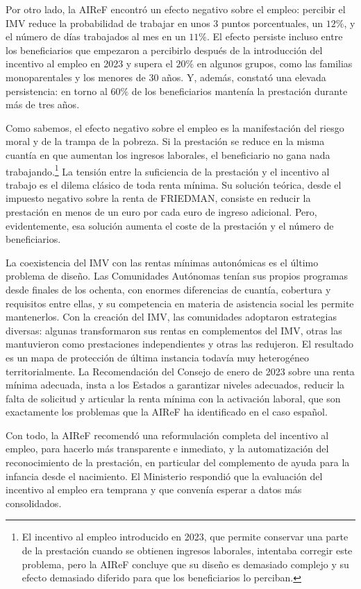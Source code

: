 \documentclass[10pt,a4paper]{article}
\begin{document}
Por otro lado, la AIReF encontró un efecto negativo sobre el empleo: percibir el IMV reduce la probabilidad de trabajar en unos $3$ puntos porcentuales, un $12\%$, y el número de días trabajados al mes en un $11\%$. El efecto persiste incluso entre los beneficiarios que empezaron a percibirlo después de la introducción del incentivo al empleo en 2023 y supera el $20\%$ en algunos grupos, como las familias monoparentales y los menores de $30$ años. Y, además, constató una elevada persistencia: en torno al $60\%$ de los beneficiarios mantenía la prestación durante más de tres años.

Como sabemos, el efecto negativo sobre el empleo es la manifestación del riesgo moral y de la trampa de la pobreza. Si la prestación se reduce en la misma cuantía en que aumentan los ingresos laborales, el beneficiario no gana nada trabajando.\footnote{El incentivo al empleo introducido en 2023, que permite conservar una parte de la prestación cuando se obtienen ingresos laborales, intentaba corregir este problema, pero la AIReF concluye que su diseño es demasiado complejo y su efecto demasiado diferido para que los beneficiarios lo perciban.
} La tensión entre la suficiencia de la prestación y el incentivo al trabajo es el dilema clásico de toda renta mínima. Su solución teórica, desde el impuesto negativo sobre la renta de FRIEDMAN, consiste en reducir la prestación en menos de un euro por cada euro de ingreso adicional. Pero, evidentemente, esa solución aumenta el coste de la prestación y el número de beneficiarios.

La coexistencia del IMV con las rentas mínimas autonómicas es el último problema de diseño. Las Comunidades Autónomas tenían sus propios programas desde finales de los ochenta, con enormes diferencias de cuantía, cobertura y requisitos entre ellas, y su competencia en materia de asistencia social les permite mantenerlos. Con la creación del IMV, las comunidades adoptaron estrategias diversas: algunas transformaron sus rentas en complementos del IMV, otras las mantuvieron como prestaciones independientes y otras las redujeron. El resultado es un mapa de protección de última instancia todavía muy heterogéneo territorialmente. La Recomendación del Consejo de enero de 2023 sobre una renta mínima adecuada, insta a los Estados a garantizar niveles adecuados, reducir la falta de solicitud y articular la renta mínima con la activación laboral, que son exactamente los problemas que la AIReF ha identificado en el caso español.

Con todo, la AIReF recomendó una reformulación completa del incentivo al empleo, para hacerlo más transparente e inmediato, y la automatización del reconocimiento de la prestación, en particular del complemento de ayuda para la infancia desde el nacimiento. El Ministerio respondió que la evaluación del incentivo al empleo era temprana y que convenía esperar a datos más consolidados.
\end{document}
